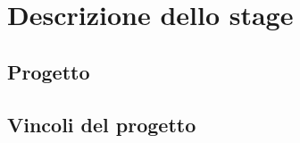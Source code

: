 \chapter{Descrizione dello stage}
\label{cap:descrizione-stage}

\section{Progetto}


\section{Vincoli del progetto}
